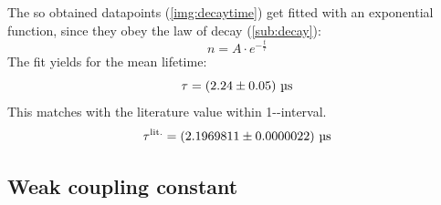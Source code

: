 The so obtained datapoints (\autoref{img:decaytime}) get fitted with an exponential function, since they obey the law of decay (\ref{sub:decay}):
\begin{equation}
    n = A \cdot e^{-\frac{t}{\tau}}
\end{equation}
The fit yields for the mean lifetime:
\begin{equation}
    \tau = \left( 2.24 \pm 0.05 \right)\,\text{\textmu s}
\end{equation}
This matches with the literature value within 1-\textsigma-interval. %
\begin{equation}
    \tau^{\text{lit.}} = \left( 2.1969811 \pm 0.0000022 \right)\,\text{\textmu s}
\end{equation}

\subsection{Weak coupling constant}